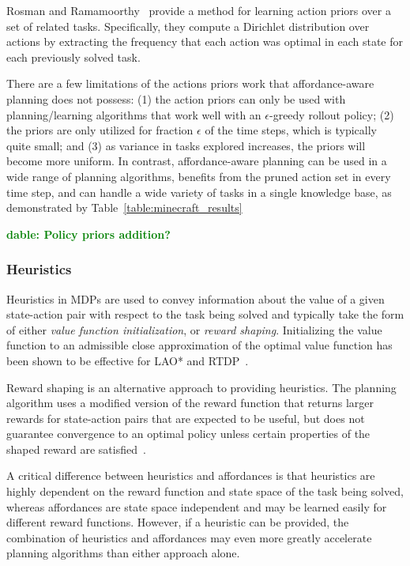 \documentclass[letterpaper]{article}
\newcommand{\dnote}[1]{\textcolor{Green}{\textbf{dable:  #1}}}
\begin{document}
Rosman and Ramamoorthy~\cite{rosman2012good} provide a method for learning action
priors over a set of related tasks. Specifically, they compute a Dirichlet distribution over 
actions by extracting the frequency that each action was optimal in each state for each 
previously solved task.

There are a few limitations of the actions priors work that affordance-aware planning
does not possess: (1) the action priors can only be used with planning/learning algorithms
that work well with an $\epsilon$-greedy rollout policy; (2) the priors are only utilized for 
fraction $\epsilon$ of the time steps, which is typically quite small; and (3) as variance in
tasks explored increases, the priors will become more uniform. In contrast, affordance-aware
planning can be used in a wide range of planning algorithms, benefits from the pruned action
set in every time step, and can handle a wide variety of tasks in a single knowledge base,
as demonstrated by Table~\ref{table:minecraft_results}

\dnote{Policy priors addition?}

\subsubsection{Heuristics}
Heuristics in MDPs are used to convey information about the value of a given state-action
pair with respect to the task being solved and typically take the form of either {\em value function initialization},
or {\em reward shaping}. Initializing the value function to an admissible close approximation of the optimal
value function has been shown to be effective for LAO* and RTDP~\cite{Hansen:1999qf}.

Reward shaping is an alternative approach to providing heuristics. The planning algorithm
uses a modified version of the reward function that returns larger rewards for state-action
pairs that are expected to be useful, but does not guarantee convergence to an optimal
policy unless certain properties of the shaped reward are satisfied~\cite{potshap}.

A critical difference between heuristics and affordances is that heuristics are highly dependent
on the reward function and state space of the task being solved, whereas affordances are state
space independent and may be learned easily for different reward functions. However, if a heuristic
can be provided, the combination of heuristics and affordances may even more greatly accelerate
planning algorithms than either approach alone.
\end{document}
